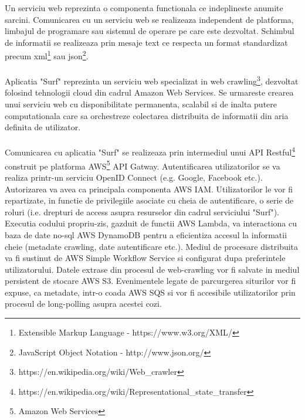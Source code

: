 \newcommand{\xmlDescription}{Extensible Markup Language - https://www.w3.org/XML/}
\newcommand{\jsonDescription}{JavaScript Object Notation - http://www.json.org/}
\newcommand{\crawlDescription}{https://en.wikipedia.org/wiki/Web\_crawler}

Un serviciu web reprezinta o componenta functionala ce indeplineste anumite sarcini. Comunicarea cu un serviciu web se realizeaza independent de platforma, limbajul de programare sau sistemul de operare pe care este dezvoltat. Schimbul de informatii se realizeaza prin mesaje text ce respecta un format standardizat precum xml\footnote{\xmlDescription} sau json\footnote{\jsonDescription}. 
\\
\\
Aplicatia "Surf" reprezinta un serviciu web specializat in web crawling\footnote{\crawlDescription}, dezvoltat folosind tehnologii cloud din cadrul Amazon Web Services. Se urmareste crearea unui serviciu web cu disponibilitate permanenta, scalabil si de inalta putere computationala care sa orchestreze colectarea distribuita de informatii din aria definita de utilizator.
\\
\\
Comunicarea cu aplicatia "Surf" se realizeaza prin intermediul unui API Restful\footnote{https://en.wikipedia.org/wiki/Representational\_state\_transfer} construit pe platforma AWS\footnote{Amazon Web Services} API Gatway. Autentificarea utilizatorilor se va realiza printr-un serviciu OpenID Connect (e.g. Google, Facebook etc.). Autorizarea va avea ca principala componenta AWS IAM. Utilizatorilor le vor fi repartizate, in functie de privilegiile asociate cu cheia de autentificare, o serie de roluri (i.e. drepturi de access asupra resurselor din cadrul serviciului "Surf"). Executia codului propriu-zis, gazduit de functii AWS Lambda, va interactiona cu baza de date no-sql AWS DynamoDB pentru a eficientiza accesul la informatii cheie (metadate crawling, date autentificare etc.). Mediul de procesare distribuita va fi sustinut de AWS Simple Workflow Service si configurat dupa preferintele utilizatorului. Datele extrase din procesul de web-crawling vor fi salvate in mediul persistent de stocare AWS S3. Evenimentele legate de parcurgerea siturilor vor fi expuse, ca metadate, intr-o coada AWS SQS si vor fi accesibile utilizatorilor prin procesul de long-polling asupra acestei cozi.
